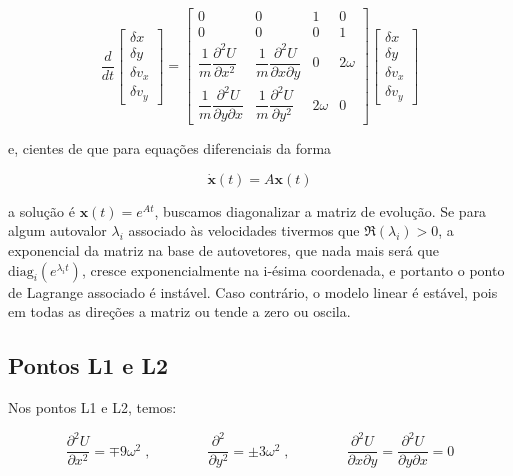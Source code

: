 \begin{equation}
\frac{d}{dt}
  \begin{bmatrix}
    \delta x \\
    \delta y \\
    \delta v_x \\
    \delta v_y
 \end{bmatrix}
=
 \begin{bmatrix}
   0 & 0 & 1 & 0 \\
   0 & 0 & 0 & 1 \\
   \dfrac{1}{m} \dfrac{\partial ^2U}{\partial x^2} & \dfrac{1}{m} \dfrac{\partial ^2U}{\partial x\partial y} & 0 & 2\omega \\
   \dfrac{1}{m} \dfrac{\partial ^2U}{\partial y \partial x} & \dfrac{1}{m} \dfrac{\partial ^2U}{\partial y^2} & 2\omega & 0
 \end{bmatrix}
   \begin{bmatrix}
    \delta x \\
    \delta y \\
    \delta v_x \\
    \delta v_y
 \end{bmatrix}
\end{equation}

e, cientes de que para equações diferenciais da forma

\begin{equation}
    \dot{\mathbf{x}}(t) = A\mathbf{x}(t)
\end{equation}

a solução é $\mathbf{x}(t) = e^{At}$, buscamos diagonalizar a matriz de evolução. Se para algum autovalor $\lambda_i$ associado às velocidades tivermos que $\Re(\lambda_i) > 0$, a exponencial da matriz na base de autovetores, que nada mais será que $\text{diag}_i(e^{\lambda_i t})$, cresce exponencialmente na i-ésima coordenada, e portanto o ponto de Lagrange associado é instável. Caso contrário, o modelo linear é estável, pois em todas as direções a matriz ou tende a zero ou oscila.

\subsection{Pontos L1 e L2}

Nos pontos L1 e L2, temos:

\begin{equation}
\dfrac{\partial ^2U}{\partial x^2} = \mp 9\omega^2 \;, \qquad \qquad \dfrac{\partial ^2}{\partial y^2} = \pm 3\omega^2 \;, \qquad \qquad \dfrac{\partial ^2U}{\partial x\partial y} = \dfrac{\partial ^2U}{\partial y\partial x} = 0
\end{equation}

